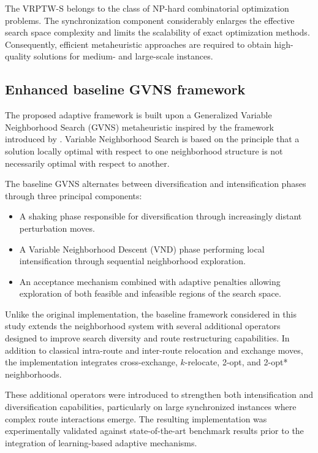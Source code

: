 \documentclass[preprint,12pt]{elsarticle}
\begin{document}
The VRPTW-S belongs to the class of NP-hard combinatorial optimization problems. The synchronization component considerably enlarges the effective search space complexity and limits the scalability of exact optimization methods. Consequently, efficient metaheuristic approaches are required to obtain high-quality solutions for medium- and large-scale instances.

\subsection{Enhanced baseline GVNS framework}
The proposed adaptive framework is built upon a Generalized Variable Neighborhood Search (GVNS) metaheuristic inspired by the framework introduced by \citet{masmoudi2025generalized}. Variable Neighborhood Search is based on the principle that a solution locally optimal with respect to one neighborhood structure is not necessarily optimal with respect to another.

The baseline GVNS alternates between diversification and intensification phases through three principal components:
\begin{itemize}
    \item A shaking phase responsible for diversification through increasingly distant perturbation moves.
    \item A Variable Neighborhood Descent (VND) phase performing local intensification through sequential neighborhood exploration.
    \item An acceptance mechanism combined with adaptive penalties allowing exploration of both feasible and infeasible regions of the search space.
\end{itemize}

Unlike the original implementation, the baseline framework considered in this study extends the neighborhood system with several additional operators designed to improve search diversity and route restructuring capabilities. In addition to classical intra-route and inter-route relocation and exchange moves, the implementation integrates cross-exchange, $k$-relocate, 2-opt, and 2-opt* neighborhoods.

These additional operators were introduced to strengthen both intensification and diversification capabilities, particularly on large synchronized instances where complex route interactions emerge. The resulting implementation was experimentally validated against state-of-the-art benchmark results prior to the integration of learning-based adaptive mechanisms.
\end{document}
